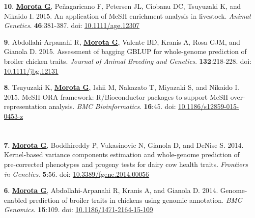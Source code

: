\documentclass[margin,line,10pt]{res}
\newenvironment{list1}{
  \begin{list}{\ding{113}}{%
      \setlength{\itemsep}{0in}
      \setlength{\parsep}{0in} \setlength{\parskip}{0in}
      \setlength{\topsep}{0in} \setlength{\partopsep}{0in} 
      \setlength{\leftmargin}{0.17in}}}{\end{list}}
\begin{document}
\begin{resume}
\begin{list1}
\vspace{0.5cm}

\item [{\bf 10}.] {\bf \underline{Morota G}}, Pe\~{n}agaricano F, Petersen JL, Ciobanu DC, Tsuyuzaki K, and Nikaido I. 2015. An application of MeSH enrichment analysis in livestock. \emph{Animal Genetics}. \textbf{46}:381-387. doi: \textcolor{blue}{\href{http://dx.doi.org/10.1111/age.12307}{10.1111/age.12307}} 

\vspace{0.5cm}

\item [{\bf 9}.] Abdollahi-Arpanahi R, {\bf \underline{Morota G}}, Valente BD, Kranis A, Rosa GJM, and Gianola D. 2015. Assessment of bagging GBLUP for whole-genome prediction of broiler chicken traits. \emph{Journal of Animal Breeding and Genetics}. \textbf{132}:218-228. doi: \textcolor{blue}{\href{http://dx.doi.org/10.1111/jbg.12131}{10.1111/jbg.12131}} 

\vspace{0.5cm}

\item [{\bf 8}.]  Tsuyuzaki K, {\bf \underline{Morota G}}, Ishii M, Nakazato T, Miyazaki S, and Nikaido I. 2015. 
  MeSH ORA framework: R/Bioconductor packages to support MeSH over-representation analysis. \emph{BMC Bioinformatics}. {\bf 16}:45. doi: \textcolor{blue}{\href{http://dx.doi.org/10.1186/s12859-015-0453-z}{10.1186/s12859-015-0453-z}} 

\end{list1}


\section{}

\begin{list1}


\item [{\bf 7}.]  {\bf \underline{Morota G}}, Boddhireddy P, Vukasinovic N, Gianola D, and DeNise S.  2014. Kernel-based variance components estimation and  whole-genome prediction of pre-corrected phenotypes and progeny tests for dairy cow health traits. \emph{Frontiers in Genetics}. {\bf 5}:56. doi: \textcolor{blue}{\href{http://dx.doi.org/10.3389/fgene.2014.00056}{10.3389/fgene.2014.00056}} 

\vspace{0.5cm}

\item [{\bf 6}.]  {\bf \underline{Morota G}}, Abdollahi-Arpanahi R, Kranis A, and Gianola D. 2014.   
     Genome-enabled prediction of broiler traits in chickens using genomic annotation. \emph{BMC Genomics}. {\bf 15}:109. doi: \textcolor{blue}{\href{http://dx.doi.org/10.1186/1471-2164-15-109}{10.1186/1471-2164-15-109}}
    


\end{list1}
\end{resume}
\end{document}
